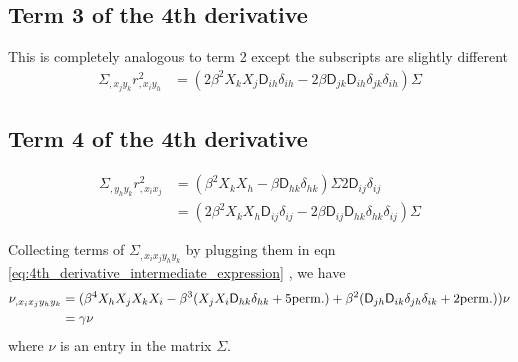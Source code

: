 \subsection{Term 3 of the 4th derivative}
This is completely analogous to term 2 except the subscripts are slightly
different
\begin{align*}
\Sigma_{,x_j y_k} r^2_{,x_i y_h}
&=\boxed { ( 2 \beta^2  X_k X_j \mathsf{D}_{ih} \delta_{ih} 
-2 \beta \mathsf{D}_{jk} \mathsf{D}_{ih} \delta_{jk} \delta_{ih}) \Sigma} 
\end{align*}

\subsection{Term 4 of the 4th derivative} 
\begin{align*}
\Sigma_{,y_h y_k} r^2_{,x_i x_j}
&= (\beta^2 X_k X_h - \beta \mathsf{D}_{hk}\delta_{hk})\Sigma 2 \mathsf{D}_{ij} \delta_{ij}\\ 
&= \boxed{(2\beta^2 X_k X_h \mathsf{D}_{ij} \delta_{ij} - 2\beta \mathsf{D}_{ij} \mathsf{D}_{hk} \delta_{hk}
\delta_{ij})\Sigma } 
\end{align*}

Collecting terms of $\Sigma_{,x_i x_j y_h y_k}$ by plugging them in eqn
\ref{eq:4th_derivative_intermediate_expression}
, we have 
\begin{align}
\nu_{,x_i x_j y_h y_k} &= (\beta^4 X_h X_j X_k X_i -  
\beta^3 (X_j X_i \mathsf{D}_{hk} \delta_{hk} + 5 {\rm perm.}) + \beta^2
(\mathsf{D}_{jh} \mathsf{D}_{ik}\delta_{jh}\delta_{ik} + 2 {\rm perm.})) \nu \\
&= \gamma \nu
\end{align}
where $\nu$ is an entry in the matrix $\Sigma$.


% 
